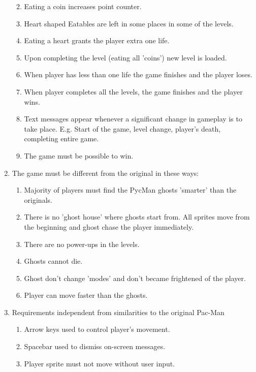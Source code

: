 \documentclass[11pt,a4paper,notitlepage]{report}
\begin{document}
\begin{enumerate}
\begin{enumerate}
						\label{req-coins-disappearing}
					\item
						Eating a coin increases point counter.
						\label{req-point++}
					\item
						Heart shaped Eatables are left in some places in some of the levels.
						\label{req-hearts}
					\item
						Eating a heart grants the player extra one life.
						\label{req-lifes++}
					\item
						Upon completing the level (eating all 'coins') new level is loaded.
						\label{req-level-up}
					\item
						When player has less than one life the game finishes and the player loses.
						\label{req-game-over}
					\item
						When player completes all the levels, the game finishes and the player wins.
						\label{req-win}
					\item
						Text messages appear whenever a significant change in gameplay is to take place.
						E.g. Start of the game, level change, player's death, completing entire game.
						\label{req-messages}
					\item
						The game must be possible to win.
						\label{req-winnable}
				\end{enumerate}
				\item
					The game must be different from the original in these ways:
					\begin{enumerate}
						\item
							Majority of players must find the PycMan ghosts 'smarter' than the originals.
							\label{req-smarter-ghosts}
						\item
							There is no 'ghost house' where ghosts start from. All sprites move from the beginning and ghost chase the player immediately.
							\label{req-no-ghost-house}
						\item
							There are no power-ups in the levels.
							\label{req-no-powerips}
						\item
							Ghosts cannot die.
							\label{req-not-dying}
						\item
							Ghost don't change 'modes' and don't became frightened of the player.
							\label{req-no-ghost-modes}
						\item
							Player can move faster than the ghosts.
							\label{req-player-faster}
					\end{enumerate}
				\item 
					Requirements independent from similarities to the original Pac-Man
					\begin{enumerate}
						\item
							Arrow keys used to control player's movement.
							\label{req-input}
						\item
							Spacebar used to dismiss on-screen messages.
							\label{req-spacebar}
						\item
							Player sprite must not move without user input.
							\label{req-player-only-input}
						

\end{enumerate}
\end{enumerate}
\end{document}
